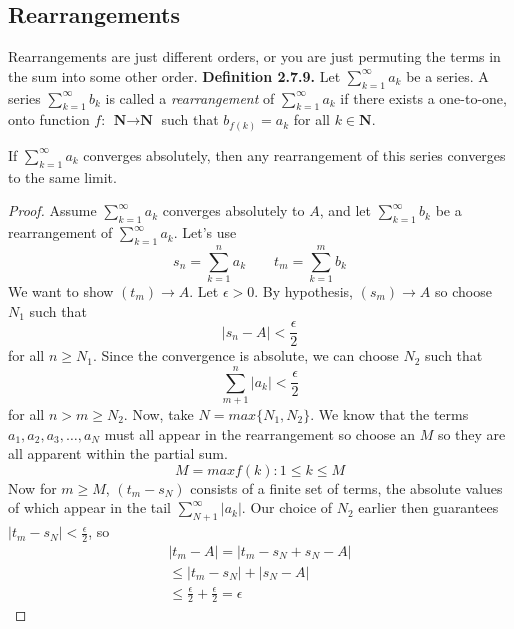     \subsection*{Rearrangements}
    Rearrangements are just different orders, or you are just permuting the terms in the sum into some other order.
    \textbf{Definition 2.7.9.} 
    Let $\sum_{k=1}^\infty a_k$ be a series. A series $\sum_{k=1}^\infty b_k$ is called a \textit{rearrangement} of $\sum_{k=1}^\infty a_k$ if there exists a one-to-one, onto function $f$: $\textbf{N} \rightarrow \textbf{N}$ such that $b_{f(k)} = a_k$ for all $k \in \textbf{N}$.
    \newline
    \setcounter{theorem}{9}
    \begin{theorem}
        If $\sum_{k=1}^\infty a_k$ converges absolutely, then any rearrangement of this series converges to the same limit.
    \end{theorem}
    \begin{proof}
        Assume $\sum_{k=1}^\infty a_k$ converges absolutely to $A$, and let $\sum_{k=1}^\infty b_k$ be a rearrangement of $\sum_{k=1}^\infty a_k$. Let's use
        $$s_n = \sum_{k=1}^n a_k \qquad t_m = \sum_{k=1}^m b_k$$
        We want to show $(t_m) \rightarrow A$.
        \newline \indent
        Let $\epsilon > 0$. By hypothesis, $(s_m) \rightarrow A$ so choose $N_1$ such that
        $$|s_n - A| < \frac{\epsilon}{2}$$
        for all $n \geq N_1$. Since the convergence is absolute, we can choose $N_2$ such that 
        $$\sum_{m+1}^n |a_k| < \frac{\epsilon}{2}$$
        for all $n > m \geq N_2$. Now, take $N = max\{N_1, N_2\}$. We know that the terms ${a_1,a_2,a_3,\dots,a_N}$ must all appear in the rearrangement so choose an $M$ so they are all apparent within the partial sum.
        $$M = max{f(k): 1 \leq k \leq M}$$
        Now for $m \geq M$, $(t_m - s_N)$ consists of a finite set of terms, the absolute values of which appear in the tail $\sum_{N+1}^\infty |a_k|$. Our choice of $N_2$ earlier then guarantees $|t_m - s_N| < \frac{\epsilon}{2}$, so
        \begin{align*}
            |t_m - A| = |t_m - s_N + s_N  - A| \\
            \leq |t_m - s_N| + |s_N - A| \\
            \leq \frac{\epsilon}{2} + \frac{\epsilon}{2} = \epsilon 
        \end{align*}
    \end{proof}